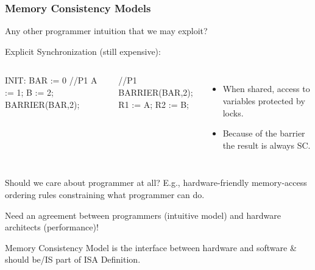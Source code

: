 \documentclass{beamer}
\renewcommand{\emph}[1]{\textcolor{structure}{#1}}
\newcommand{\emp}[1]{\textcolor{DikuRed}{ #1}}
\begin{document}
\begin{frame}[fragile,t]
\frametitle{Memory Consistency Models}

Any other programmer intuition that we may exploit?

Explicit Synchronization (still expensive):

\begin{columns}
\begin{colorcode}[fontsize=\scriptsize]
        INIT: BAR := 0
//P1
A := 1;
B := 2;
BARRIER(BAR,2);
\end{colorcode} 
\begin{colorcode}[fontsize=\scriptsize]

//P1
BARRIER(BAR,2);
R1 := A;
R2 := B;
\end{colorcode} 
\begin{itemize}
    \item When shared, access to variables protected by locks. 
    \item Because of the barrier the result is always SC.
\end  {itemize}
\end{columns}
\bigskip

\emp{Should we care about programmer at all?} E.g.,
hardware-friendly memory-access ordering rules constraining what
programmer can do.
\medskip

Need an agreement between programmers (intuitive model) 
and hardware architects (performance)! 
\medskip

\emph{Memory Consistency Model is the interface between hardware and software \& 
should be/IS part of ISA Definition.}
\end{frame}
\end{document}
